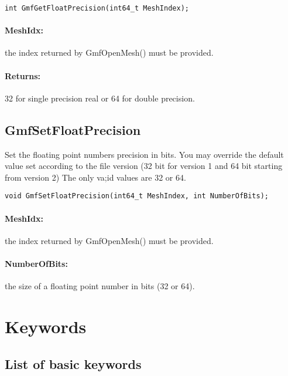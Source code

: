 \documentclass[a4paper,12pt]{article}
\begin{document}
\begin{tt}
\begin{verbatim}
int GmfGetFloatPrecision(int64_t MeshIndex);
\end{verbatim}
\end{tt}
\normalfont

\paragraph{MeshIdx:}
the index returned by GmfOpenMesh() must be provided.

\paragraph{Returns:} 32 for single precision real or 64 for double precision.


\subsection{GmfSetFloatPrecision}
Set the floating point numbers precision in bits.
You may override the default value set according to the file version (32 bit for version 1 and 64 bit starting from version 2)
The only va;id values are 32 or 64.

\begin{tt}
\begin{verbatim}
void GmfSetFloatPrecision(int64_t MeshIndex, int NumberOfBits);
\end{verbatim}
\end{tt}
\normalfont

\paragraph{MeshIdx:}
the index returned by GmfOpenMesh() must be provided.

\paragraph{NumberOfBits:}
the size of a floating point number in bits (32 or 64).



%
%

\newpage
\section{Keywords}
\label{keywords}

\subsection{List of basic keywords}
\end{document}
